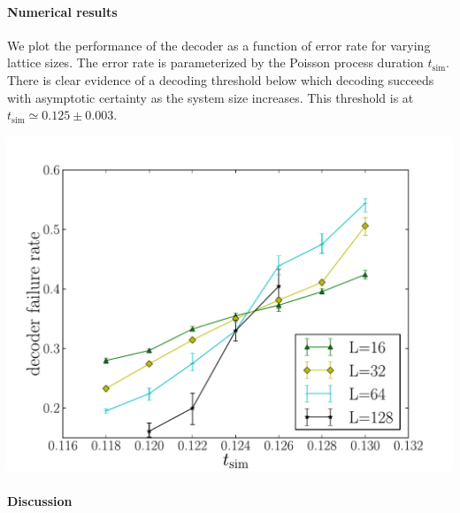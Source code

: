 \documentclass[aps, prl, letterpaper, twocolumn, superscriptaddress, notitlepage]{revtex4-1}
\begin{document}
\paragraph{Numerical results}

We plot the performance of the decoder as a function of error rate for varying lattice sizes. The error rate is parameterized by the Poisson process duration $t_{\mathrm{sim}}$. There is clear evidence of a decoding threshold below
which decoding succeeds with asymptotic certainty as the system size increases. This threshold is at $t_{\mathrm{sim}}\simeq 0.125 \pm 0.003.$

\begin{center}
	\includegraphics[width=\columnwidth]{anyons-kyle.pdf}
\end{center}

	

\paragraph{Discussion}

	
\end{document}
